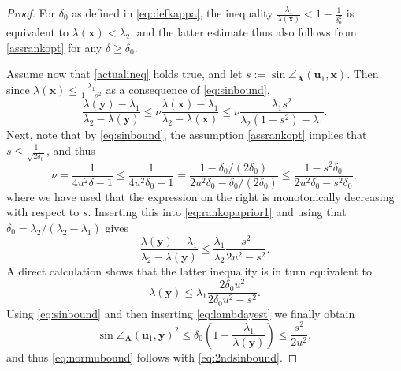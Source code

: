 \documentclass[a4paper,11pt,oneside]{amsart}
\theoremstyle{definition}
\theoremstyle{remark}
\newcommand{\A}{\ten A}
\newcommand{\ten}[1]{\boldsymbol{#1}}
\numberwithin{equation}{section}
\numberwithin{theorem}{section}
\begin{document}
\begin{proof}
For $\delta_0$ as defined in \eqref{eq:defkappa}, the inequality $\frac{\lambda_1}{\lambda(\ten x)} < 1 - \frac{1}{\delta_0^{2}}$ is equivalent to $\lambda(\ten x) < \lambda_2$, 
and the latter estimate thus also follows from \eqref{assrankopt} for any $\delta \geq \delta_0$.

 Assume now that \cref{actualineq} holds true, and let $s := \sin \angle_{\A}(\ten u_1,\ten x)$. Then since $\lambda(\ten{x}) \leq \frac{\lambda_1}{1 - s^2}$ as a consequence of  \cref{eq:sinbound}, 
 \begin{equation}\label{eq:rankopaprior1}
    \frac{\lambda(\ten{y}) - \lambda_1}{\lambda_2 - \lambda(\ten{y})}\leq \nu  \frac{\lambda(\ten{x}) - \lambda_1}{\lambda_2 - \lambda(\ten{x})}
     \leq \nu \frac{\lambda_1 s^2}{\lambda_2 (1 - s^2) - \lambda_1} .
 \end{equation}
 Next, note that by \cref{eq:sinbound}, the assumption \cref{assrankopt} implies that $s \leq \frac{1}{\sqrt{2 \delta_0}}$, and thus 
 \begin{equation}\label{eq:rankopaprior2}
\nu =   \frac{1}{4 u^2 \delta  - 1} \leq \frac{1}{4 u^2 \delta_0  - 1} =  \frac{1 - \delta_0 / (2 \delta_0)}{2u^2 \delta_0 - \delta_0 / (2 \delta_0)}  \leq  \frac{1 - s^2 \delta_0}{2u^2 \delta_0 - s^2  \delta_0},
 \end{equation}
 where we have used that the expression on the right is monotonically decreasing with respect to $s$. Inserting this into \eqref{eq:rankopaprior1} and using that $\delta_0 =\lambda_2 /(\lambda_2 - \lambda_1)$ gives
 \[
      \frac{\lambda(\ten{y}) - \lambda_1}{\lambda_2 - \lambda(\ten{y})} \leq  \frac{\lambda_1}{\lambda_2}\frac{s^2}{2u^2 - s^2} .
 \]
A direct calculation shows that the latter inequality is in turn equivalent to
\begin{equation}\label{eq:lambdayest}
 \lambda(\ten{y}) \leq \lambda_1 \frac{2 \delta_0 u^2}{2 \delta_0 u^2 - s^2}.
\end{equation}
Using \cref{eq:sinbound} and then inserting \eqref{eq:lambdayest} we finally obtain
\begin{equation*}
\sin \angle_{\A}(\ten u_1,\ten y)^2  \leq \delta_0 \left( 1 - \frac{\lambda_1}{\lambda(\ten y)} \right) 
%
%
%
%
  \leq   \frac{s^2}{2 u^2},
\end{equation*}
and thus \cref{eq:normubound} follows with \cref{eq:2ndsinbound}.
\end{proof}
\end{document}
